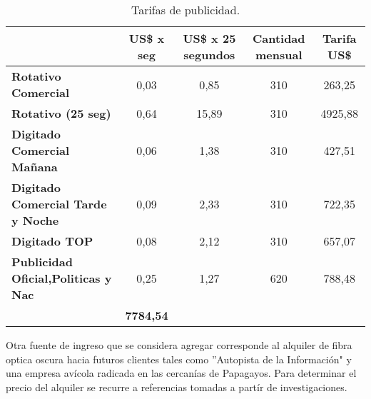 \begin{itemize}
\begin{table}[H]
  \centering
  \tiny
    \begin{tabular}{|cccc|c|}
    \hline
    \rowcolor[rgb]{ .773,  .851,  .945} \multicolumn{1}{|c|}{\textbf{Publicidad}} & \multicolumn{1}{c|}{\textbf{US\$ x seg}} & \multicolumn{1}{c|}{\textbf{US\$ x 25 segundos}} & \textbf{Cantidad mensual} & \textbf{Tarifa US\$} \bigstrut\\
    \hline
    \multicolumn{1}{|l|}{\textbf{Rotativo Comercial}} & \multicolumn{1}{c|}{0,03} & \multicolumn{1}{c|}{0,85} & 310   & 263,25 \bigstrut\\
    \hline
    \multicolumn{1}{|l|}{\textbf{Rotativo (25 seg)}} & \multicolumn{1}{c|}{0,64} & \multicolumn{1}{c|}{15,89} & 310   & 4925,88 \bigstrut\\
    \hline
    \multicolumn{1}{|l|}{\textbf{Digitado Comercial Mañana}} & \multicolumn{1}{c|}{0,06} & \multicolumn{1}{c|}{1,38} & 310   & 427,51 \bigstrut\\
    \hline
    \multicolumn{1}{|l|}{\textbf{Digitado Comercial Tarde y Noche}} & \multicolumn{1}{c|}{0,09} & \multicolumn{1}{c|}{2,33} & 310   & 722,35 \bigstrut\\
    \hline
    \multicolumn{1}{|l|}{\textbf{Digitado TOP}} & \multicolumn{1}{c|}{0,08} & \multicolumn{1}{c|}{2,12} & 310   & 657,07 \bigstrut\\
    \hline
    \multicolumn{1}{|l|}{\textbf{Publicidad Oficial,Politicas y Nac}} & \multicolumn{1}{c|}{0,25} & \multicolumn{1}{c|}{1,27} & 620   & 788,48 \bigstrut\\
    \hline
    \rowcolor[rgb]{ .773,  .851,  .945} \multicolumn{4}{|c|}{\textbf{Total mensual}} & \textbf{7784,54} \bigstrut\\
    \hline
    \end{tabular}%
	\caption{Tarifas de publicidad.}
  \label{tab:tarifas-publicidad}%
\end{table}%


\end{itemize}


Otra fuente de ingreso que se considera agregar corresponde al alquiler de fibra optica oscura hacia futuros clientes tales como ''Autopista de la Información"
y una empresa avícola radicada en las cercanías de Papagayos. Para determinar el precio del alquiler se recurre a referencias tomadas a partír de investigaciones.








